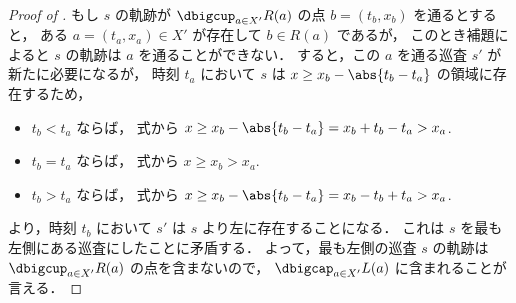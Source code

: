 \begin{proof}[Proof of ]
	もし $s$ の軌跡が $\dbigcup_{a \in X'} R(a)$ の点 $b = (t_b,x_b)$ を通るとすると，
	ある $a = (t_a,x_a) \in X'$ が存在して $b \in R(a)$ であるが，
	このとき補題によると
	$s$ の軌跡は $a$ を通ることができない．
	すると，この $a$ を通る巡査 $s'$ が新たに必要になるが，
	時刻 $t_a$ において $s$ は $x \geq x_b - \abs{t_b - t_a}$ の領域に存在するため，
	\begin{itemize}
		\item $t_b < t_a$ ならば，
		式から
		$x \geq x_b - \abs{t_b - t_a} = x_b + t_b - t_a > x_a$.
		\item $t_b = t_a$ ならば，
		式から
		$x \geq x_b > x_a$.
		\item $t_b > t_a$ ならば，
		式から
		$x \geq x_b - \abs{t_b - t_a} = x_b - t_b + t_a > x_a$.
	\end{itemize}
	より，時刻 $t_b$ において $s'$ は $s$ より左に存在することになる．
	これは $s$ を最も左側にある巡査にしたことに矛盾する．
	よって，最も左側の巡査 $s$ の軌跡は
	$\dbigcup_{a \in X'} R(a)$ の点を含まないので，
	$\dbigcap_{a \in X'} L(a)$ に含まれることが言える．
\end{proof}












